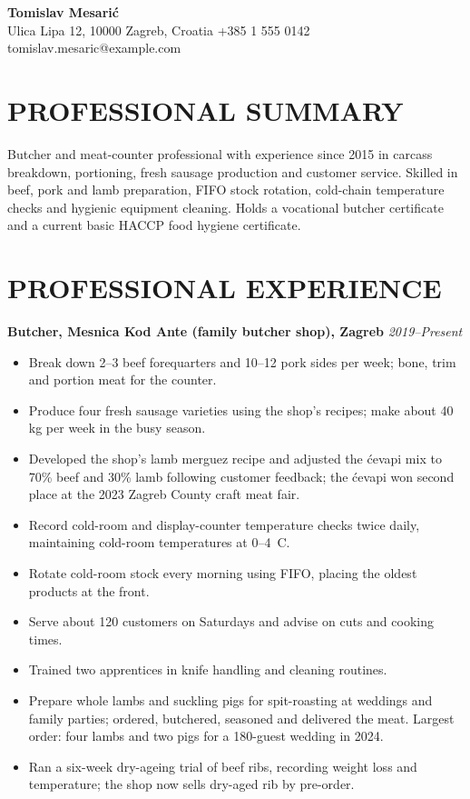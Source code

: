 \documentclass[11pt,a4paper]{article}
\begin{document}
\begin{center}
{\Huge\bfseries\color{primarycolor} Tomislav Mesarić}\\[0.4em]
{\small Ulica Lipa 12, 10000 Zagreb, Croatia \textbar{} +385 1 555 0142 \textbar{} tomislav.mesaric@example.com}
\end{center}

\section*{PROFESSIONAL SUMMARY}
Butcher and meat-counter professional with experience since 2015 in carcass breakdown, portioning, fresh sausage production and customer service. Skilled in beef, pork and lamb preparation, FIFO stock rotation, cold-chain temperature checks and hygienic equipment cleaning. Holds a vocational butcher certificate and a current basic HACCP food hygiene certificate.

\section*{PROFESSIONAL EXPERIENCE}
\noindent\textbf{Butcher, Mesnica Kod Ante (family butcher shop), Zagreb} \hfill \textit{2019--Present}
\begin{itemize}
\item Break down 2--3 beef forequarters and 10--12 pork sides per week; bone, trim and portion meat for the counter.
\item Produce four fresh sausage varieties using the shop’s recipes; make about 40 kg per week in the busy season.
\item Developed the shop’s lamb merguez recipe and adjusted the ćevapi mix to 70\% beef and 30\% lamb following customer feedback; the ćevapi won second place at the 2023 Zagreb County craft meat fair.
\item Record cold-room and display-counter temperature checks twice daily, maintaining cold-room temperatures at 0--4~\textdegree C.
\item Rotate cold-room stock every morning using FIFO, placing the oldest products at the front.
\item Serve about 120 customers on Saturdays and advise on cuts and cooking times.
\item Trained two apprentices in knife handling and cleaning routines.
\item Prepare whole lambs and suckling pigs for spit-roasting at weddings and family parties; ordered, butchered, seasoned and delivered the meat. Largest order: four lambs and two pigs for a 180-guest wedding in 2024.
\item Ran a six-week dry-ageing trial of beef ribs, recording weight loss and temperature; the shop now sells dry-aged rib by pre-order.
\end{itemize}
\end{document}
